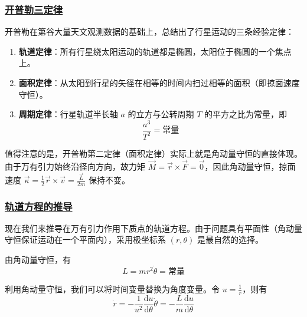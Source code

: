 \subsubsection{\protect\hyperlink{:}{开普勒三定律}}

开普勒在第谷大量天文观测数据的基础上，总结出了行星运动的三条经验定律：

\begin{theorem}[开普勒三定律]
    \begin{enumerate}
        \item \textbf{轨道定律}：所有行星绕太阳运动的轨道都是椭圆，太阳位于椭圆的一个焦点上。
        \item \textbf{面积定律}：从太阳到行星的矢径在相等的时间内扫过相等的面积（即掠面速度守恒）。
        \item \textbf{周期定律}：行星轨道半长轴 $a$ 的立方与公转周期 $T$ 的平方之比为常量，即
        \begin{equation}
            \frac{a^3}{T^2} = \text{常量}
        \end{equation}
    \end{enumerate}
\end{theorem}

值得注意的是，开普勒第二定律（面积定律）实际上就是角动量守恒的直接体现。由于万有引力始终沿径向方向，故力矩 $\vec{M} = \vec{r} \times \vec{F} = \vec{0}$，因此角动量守恒，掠面速度 $\vec{\kappa} = \frac{1}{2}\vec{r} \times \vec{v} = \frac{\vec{L}}{2m}$ 保持不变。

\subsubsection{\protect\hyperlink{:}{轨道方程的推导}}

现在我们来推导在万有引力作用下质点的轨道方程。由于问题具有平面性（角动量守恒保证运动在一个平面内），采用极坐标系 $(r,\theta)$ 是最自然的选择。

由角动量守恒，有
\begin{equation}
    L = mr^2\dot{\theta} = \text{常量}
\end{equation}

利用角动量守恒，我们可以将时间变量替换为角度变量。令 $u = \frac{1}{r}$，则有
\begin{equation}
    \dot{r} = -\frac{1}{u^2}\frac{\mathrm{d}u}{\mathrm{d}\theta}\dot{\theta} = -\frac{L}{m}\frac{\mathrm{d}u}{\mathrm{d}\theta}
\end{equation}

